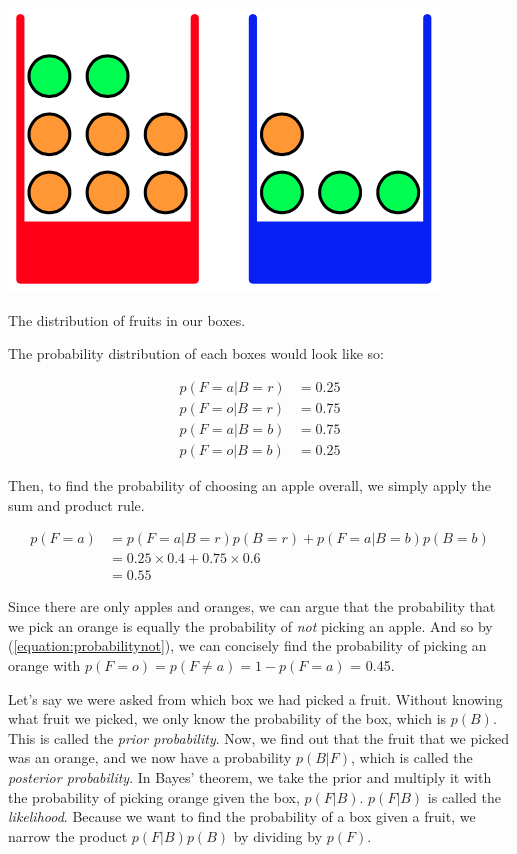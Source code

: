 \documentclass{tufte-handout}
\begin{document}
\begin{marginfigure}
  \includegraphics[width=\linewidth]{fruitboxes.png}
  \caption{The distribution of fruits in our boxes.}
\end{marginfigure}

The probability distribution of each boxes would look like so:

\begin{align}
  p(F = a | B = r) &= 0.25 \\
  p(F = o | B = r) &= 0.75 \\
  p(F = a | B = b) &= 0.75 \\
  p(F = o | B = b) &= 0.25
\end{align}

Then, to find the probability of choosing an apple overall, we simply apply the
sum and product rule.

\begin{equation}
  \begin{aligned}
    p(F = a) &= p(F = a|B = r)p(B = r) + p(F = a|B = b)p(B = b)\\
             &= 0.25 \times 0.4 + 0.75 \times 0.6 \\
             &= 0.55
  \end{aligned}
\end{equation}

Since there are only apples and oranges, we can argue that the probability that
we pick an orange is equally the probability of \emph{not} picking an apple. And
so by (\ref{equation:probabilitynot}), we can concisely find the probability of
picking an orange with $p(F = o) = p(F \neq a) = 1 - p(F = a)$ = 0.45.

Let's say we were asked from which box we had picked a fruit. Without knowing
what fruit we picked, we only know the probability of the box, which is $p(B)$.
This is called the \emph{prior probability}. Now, we find out that the fruit
that we picked was an orange, and we now have a probability $p(B|F)$, which is
called the \emph{posterior probability}. In Bayes' theorem, we take the prior
and multiply it with the probability of picking orange given the box, $p(F|B)$.
$p(F|B)$ is called the \emph{likelihood}. Because we want to find the
probability of a box given a fruit, we narrow the product $p(F|B)p(B)$ by dividing by
$p(F)$.
\end{document}
